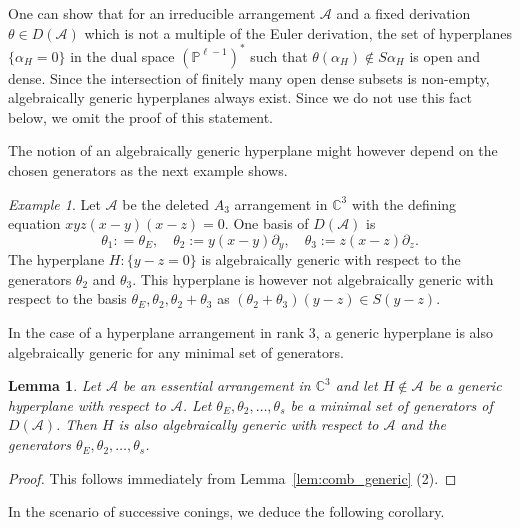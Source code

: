 \documentclass[a4paper,11pt]{amsart}
\def\CC{{\mathbb{C}}}%
\def\C{{\mathbb{C}}}%
\def\A{{\mathcal{A}}}%
\def\C{{\mathcal{C}}}%
\numberwithin{equation}{section}
\newtheorem{lemma}[theorem]{Lemma}
\theoremstyle{remark}
\newtheorem{example}[theorem]{Example}
\begin{document}
One can show that for an irreducible arrangement $\A$ and a fixed derivation $\theta \in D(\A)$ which is not a multiple of the Euler derivation, the set of hyperplanes $\{\alpha_H=0\}$ in the dual space $(\mathbb{P}^{\ell-1})^*$ such that $\theta(\alpha_H)\notin S \alpha_H$ is open and dense.
Since the intersection of finitely many open dense subsets is non-empty, algebraically generic hyperplanes always exist.
Since we do not use this fact below, we omit the proof of this statement.

The notion of an algebraically generic hyperplane might however depend on the chosen generators as the next example shows.

\begin{example}
	Let $\A$ be the deleted $A_3$ arrangement in $\CC^3$ with the defining equation $xyz(x-y)(x-z)=0$.
	One basis of $D(\A)$ is
	\[
	\theta_{1} : =\theta_E, \quad \theta_2:=y(x-y)\partial_y, \quad \theta_3:=z(x-z)\partial_z.
	\]
	The hyperplane $H:\{y-z=0\}$ is algebraically generic with respect to the generators $\theta_2$ and $\theta_3$.
	This hyperplane is however not algebraically generic with respect to the basis $\theta_E, \theta_2, \theta_2+\theta_3$ as $(\theta_2+\theta_3)(y-z)\in S(y-z)$.
\end{example}

In the case of a hyperplane arrangement in rank $3$, a generic hyperplane is also algebraically generic for any minimal set of generators.
\begin{lemma}\label{lem:comb_gen_3}
	Let $\A$ be an essential arrangement in $\CC^3$ and let $H\notin \A$ be a generic hyperplane with respect to $\A$.
	Let $\theta_E,\theta_2,\dots,\theta_s$ be a minimal set of generators of $D(\A)$.
	Then $H$ is also algebraically generic with respect to $\A$ and the generators $\theta_E,\theta_2,\dots,\theta_s$.
\end{lemma}
\begin{proof}
This follows immediately from Lemma~\ref{lem:comb_generic} (2).	
\end{proof}



In the scenario of successive conings, we deduce the following corollary.
\end{document}
